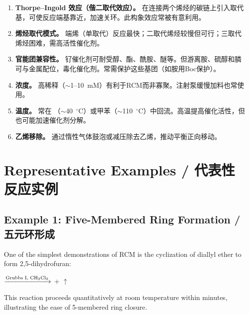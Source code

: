 \documentclass[11pt, a4paper]{article}
\begin{document}
\begin{cnbox}[中文]
\begin{enumerate}[label=\textbf{\arabic*.}]
  \item \textbf{Thorpe--Ingold 效应（偕二取代效应）。} 在连接两个烯烃的碳链上引入取代基，可使反应端基靠近，加速关环。此构象效应常被有意利用。

  \item \textbf{烯烃取代模式。} 端烯（单取代）反应最快；二取代烯烃较慢但可行；三取代烯烃困难，需高活性催化剂。

  \item \textbf{官能团兼容性。} 钌催化剂可耐受醇、酯、酰胺、醚等。但游离胺、硫醇和膦可与金属配位，毒化催化剂。常需保护这些基团（如胺用Boc保护）。

  \item \textbf{浓度。} 高稀释（$\sim$1--10~mM）有利于RCM而非寡聚。注射泵缓慢加料也常使用。

  \item \textbf{温度。} 常在 （$\sim$40~$^\circ$C）或甲苯（$\sim$110~$^\circ$C）中回流。高温提高催化活性，但也可能加速催化剂分解。

  \item \textbf{乙烯移除。} 通过惰性气体鼓泡或减压除去乙烯，推动平衡正向移动。
\end{enumerate}
\end{cnbox}


\section{Representative Examples / 代表性反应实例}

\subsection{Example 1: Five-Membered Ring Formation / 五元环形成}

\begin{enbox}[English]
One of the simplest demonstrations of RCM is the cyclization of diallyl ether to form 2,5-dihydrofuran:

\begin{center}
 $\xrightarrow{\text{Grubbs I, \ce{CH2Cl2}}}$
 +  $\uparrow$
\end{center}

This reaction proceeds quantitatively at room temperature within minutes, illustrating the ease of 5-membered ring closure.
\end{enbox}
\end{document}
